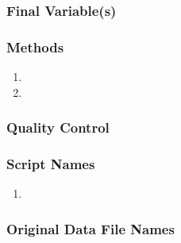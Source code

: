 \subsubsection*{Final Variable(s)}

\subsubsection*{Methods}

\begin{enumerate}[nolistsep]
\item
\item
\end{enumerate}

\subsubsection*{Quality Control}

\subsubsection*{Script Names}

\begin{enumerate}[nolistsep]
\item
\end{enumerate}

\subsubsection*{Original Data File Names}

